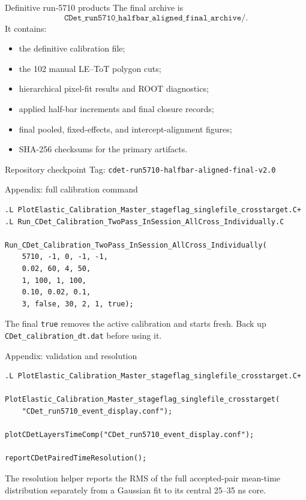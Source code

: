 \documentclass[aspectratio=169,10pt]{beamer}
\begin{document}
\begin{frame}{Definitive run-5710 products}
\small
The final archive is
\[
\texttt{CDet\_run5710\_halfbar\_aligned\_final\_archive/}.
\]
It contains:
\begin{itemize}
  \item the definitive calibration file;
  \item the 102 manual LE--ToT polygon cuts;
  \item hierarchical pixel-fit results and ROOT diagnostics;
  \item applied half-bar increments and final closure records;
  \item final pooled, fixed-effects, and intercept-alignment figures;
  \item SHA-256 checksums for the primary artifacts.
\end{itemize}
\vspace{0.25cm}
\begin{block}{Repository checkpoint}
Tag: \texttt{cdet-run5710-halfbar-aligned-final-v2.0}
\end{block}
\end{frame}

\appendix

\begin{frame}[fragile]{Appendix: full calibration command}
\scriptsize
\begin{verbatim}
.L PlotElastic_Calibration_Master_stageflag_singlefile_crosstarget.C+
.L Run_CDet_Calibration_TwoPass_InSession_AllCross_Individually.C

Run_CDet_Calibration_TwoPass_InSession_AllCross_Individually(
    5710, -1, 0, -1, -1,
    0.02, 60, 4, 50,
    1, 100, 1, 100,
    0.10, 0.02, 0.1,
    3, false, 30, 2, 1, true);
\end{verbatim}
\vspace{0.25cm}
The final \texttt{true} removes the active calibration and starts fresh. Back up
\texttt{CDet\_calibration\_dt.dat} before using it.
\end{frame}

\begin{frame}[fragile]{Appendix: validation and resolution}
\scriptsize
\begin{verbatim}
.L PlotElastic_Calibration_Master_stageflag_singlefile_crosstarget.C+

PlotElastic_Calibration_Master_stageflag_singlefile_crosstarget(
    "CDet_run5710_event_display.conf");

plotCDetLayersTimeComp("CDet_run5710_event_display.conf");

reportCDetPairedTimeResolution();
\end{verbatim}
\vspace{0.25cm}
The resolution helper reports the RMS of the full accepted-pair mean-time
distribution separately from a Gaussian fit to its central 25--35 ns core.
\end{frame}
\end{document}
